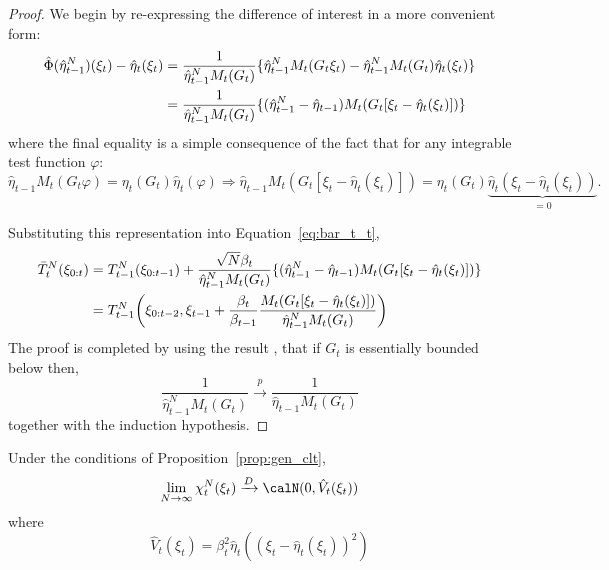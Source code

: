 \begin{proof}
  We begin by re-expressing the difference of interest in a more convenient form:
  \begin{align}
    \hat\Phi(\hat\eta_{t-1}^N)(\xi_t) - \hat\eta_t(\xi_t)
    &= \frac{1}{\hat\eta_{t-1}^NM_t(G_t)}\{
      \hat\eta_{t-1}^NM_t(G_t\xi_t) -
      \hat\eta_{t-1}^NM_t(G_t)\hat\eta_t(\xi_t)\} \notag\\
    &= \frac{1}{\hat\eta_{t-1}^NM_t(G_t)}
    \{(\hat\eta_{t-1}^N-\hat\eta_{t-1})M_t(G_t[\xi_t-\hat\eta_t(\xi_t)])\}
  \end{align}
where the final equality is a simple consequence of the fact that for any
integrable test function $\varphi$:
\begin{equation*}
\hat\eta_{t-1} M_t (G_t \varphi) = \eta_t(G_t) \hat\eta_t(\varphi) \Rightarrow
\hat\eta_{t-1} M_t (G_t [\xi_t - \hat\eta_t(\xi_t)]) = \eta_t(G_t)
\underset{=0}{\underbrace{\hat\eta_t(\xi_t - \hat\eta_t(\xi_t))}} .
\end{equation*}

Substituting this representation into Equation~\eqref{eq:bar_t_t},
  \begin{align}
    \bar{T}_t^N(\xi_{0:t})
    &= T_{t-1}^N(\xi_{0:t-1}) +
    \frac{\sqrt{N}\beta_t}{\hat\eta_{t-1}^NM_t(G_t)}
    \{(\hat\eta_{t-1}^N-\hat\eta_{t-1})M_t(G_t[\xi_t-\hat\eta_t(\xi_t)])\}
    \notag\\
    &= T_{t-1}^N\biggl(\xi_{0:t-2},
    \xi_{t-1} + \frac{\beta_t}{\beta_{t-1}}
    \frac{M_t(G_t[\xi_t-\hat\eta_t(\xi_t)])}{\hat\eta_{t-1}^NM_t(G_t)}\biggr)
  \end{align}
  The proof is completed by using the result \cite[cf.
  Sec.~7.4.3]{DelMoral:2004ux}, that if $G_t$ is essentially bounded below
  then,
  \begin{equation*}
    \frac{1}{\hat\eta_{t-1}^NM_t(G_t)} \xrightarrow{p}
    \frac{1}{\hat\eta_{t-1}M_t(G_t)}
  \end{equation*}
  together with the induction hypothesis.
\end{proof}

\begin{lemma}\label{lem:sampling}
  Under the conditions of Proposition~\ref{prop:gen_clt},
  \begin{equation}
    \lim_{N\to\infty}\chi_t^N(\xi_t)\xrightarrow{D}\calN(0, \hat{V}_t(\xi_t))
  \end{equation}
  where
  \begin{equation}
    \hat{V}_t(\xi_t) = \beta_t^2\hat\eta_t((\xi_t - \hat\eta_t(\xi_t))^2)
  \end{equation}
\end{lemma}

